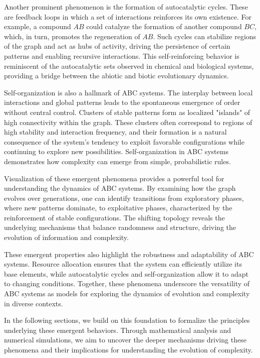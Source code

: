 \documentclass[%
 preprint, linenumbers,
 amsmath,amssymb,
 aps, physrev,
]{revtex4-2}
\begin{document}
Another prominent phenomenon is the formation of autocatalytic cycles. These are feedback loops in which a set of interactions reinforces its own existence. For example, a compound $AB$ could catalyze the formation of another compound $BC$, which, in turn, promotes the regeneration of $AB$. Such cycles can stabilize regions of the graph and act as hubs of activity, driving the persistence of certain patterns and enabling recursive interactions. This self-reinforcing behavior is reminiscent of the autocatalytic sets observed in chemical and biological systems, providing a bridge between the abiotic and biotic evolutionary dynamics.

Self-organization is also a hallmark of ABC systems. The interplay between local interactions and global patterns leads to the spontaneous emergence of order without central control. Clusters of stable patterns form as localized "islands" of high connectivity within the graph. These clusters often correspond to regions of high stability and interaction frequency, and their formation is a natural consequence of the system’s tendency to exploit favorable configurations while continuing to explore new possibilities. Self-organization in ABC systems demonstrates how complexity can emerge from simple, probabilistic rules.

Visualization of these emergent phenomena provides a powerful tool for understanding the dynamics of ABC systems. By examining how the graph evolves over generations, one can identify transitions from exploratory phases, where new patterns dominate, to exploitative phases, characterized by the reinforcement of stable configurations. The shifting topology reveals the underlying mechanisms that balance randomness and structure, driving the evolution of information and complexity.

These emergent properties also highlight the robustness and adaptability of ABC systems. Resource allocation ensures that the system can efficiently utilize its base elements, while autocatalytic cycles and self-organization allow it to adapt to changing conditions. Together, these phenomena underscore the versatility of ABC systems as models for exploring the dynamics of evolution and complexity in diverse contexts.

In the following sections, we build on this foundation to formalize the principles underlying these emergent behaviors. Through mathematical analysis and numerical simulations, we aim to uncover the deeper mechanisms driving these phenomena and their implications for understanding the evolution of complexity.
\end{document}
